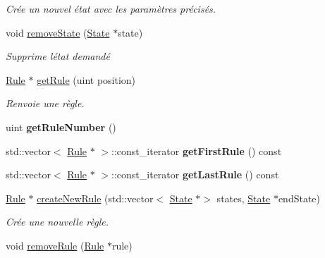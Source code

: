 \begin{DoxyCompactItemize}
\begin{DoxyCompactList}\small\item\em Crée un nouvel état avec les paramètres précisés. \end{DoxyCompactList}\item 
void \mbox{\hyperlink{class_simulator_manager_abe61b011be2d4d43c956cbc2d0cca186}{remove\+State}} (\mbox{\hyperlink{class_state}{State}} $\ast$state)
\begin{DoxyCompactList}\small\item\em Supprime l\textquotesingle{}état demandé \end{DoxyCompactList}\item 
\mbox{\hyperlink{class_rule}{Rule}} $\ast$ \mbox{\hyperlink{class_simulator_manager_a9a3c8a76c720b2539d67d812c967eb5c}{get\+Rule}} (uint position)
\begin{DoxyCompactList}\small\item\em Renvoie une règle. \end{DoxyCompactList}\item 
\mbox{\label{class_simulator_manager_af9106cc20549e92c49e673188e9c7170}} 
uint {\bfseries get\+Rule\+Number} ()
\item 
\mbox{\label{class_simulator_manager_aae814839bf8952705d2e415676bc17f9}} 
std\+::vector$<$ \mbox{\hyperlink{class_rule}{Rule}} $\ast$ $>$\+::const\+\_\+iterator {\bfseries get\+First\+Rule} () const
\item 
\mbox{\label{class_simulator_manager_a488544de9b6e91cf897dbad4b33e298c}} 
std\+::vector$<$ \mbox{\hyperlink{class_rule}{Rule}} $\ast$ $>$\+::const\+\_\+iterator {\bfseries get\+Last\+Rule} () const
\item 
\mbox{\hyperlink{class_rule}{Rule}} $\ast$ \mbox{\hyperlink{class_simulator_manager_aa6810debdafa76433bef399acff9d3a6}{create\+New\+Rule}} (std\+::vector$<$ \mbox{\hyperlink{class_state}{State}} $\ast$$>$ states, \mbox{\hyperlink{class_state}{State}} $\ast$end\+State)
\begin{DoxyCompactList}\small\item\em Crée une nouvelle règle. \end{DoxyCompactList}\item 
void \mbox{\hyperlink{class_simulator_manager_af1d1744014e8898b4e0a359c4a68e29e}{remove\+Rule}} (\mbox{\hyperlink{class_rule}{Rule}} $\ast$rule)
$$
\end{DoxyCompactItemize}
